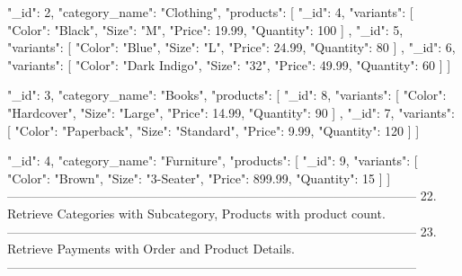 {
  "_id": 2,
  "category_name": "Clothing",
  "products": [
    {
      "_id": 4,
      "variants": [
        {
          "Color": "Black",
          "Size": "M",
          "Price": 19.99,
          "Quantity": 100
        }
      ]
    },
    {
      "_id": 5,
      "variants": [
        {
          "Color": "Blue",
          "Size": "L",
          "Price": 24.99,
          "Quantity": 80
        }
      ]
    },
    {
      "_id": 6,
      "variants": [
        {
          "Color": "Dark Indigo",
          "Size": "32",
          "Price": 49.99,
          "Quantity": 60
        }
      ]
    }
  ]
}

{
  "_id": 3,
  "category_name": "Books",
  "products": [
    {
      "_id": 8,
      "variants": [
        {
          "Color": "Hardcover",
          "Size": "Large",
          "Price": 14.99,
          "Quantity": 90
        }
      ]
    },
    {
      "_id": 7,
      "variants": [
        {
          "Color": "Paperback",
          "Size": "Standard",
          "Price": 9.99,
          "Quantity": 120
        }
      ]
    }
  ]
}

{
  "_id": 4,
  "category_name": "Furniture",
  "products": [
    {
      "_id": 9,
      "variants": [
        {
          "Color": "Brown",
          "Size": "3-Seater",
          "Price": 899.99,
          "Quantity": 15
        }
      ]
    }
  ]
}
--------------------------------------------------------------------------------------------------
22. Retrieve Categories with Subcategory, Products with product count.
--------------------------------------------------------------------------------------------------
23. Retrieve Payments with Order and Product Details.
--------------------------------------------------------------------------------------------------

